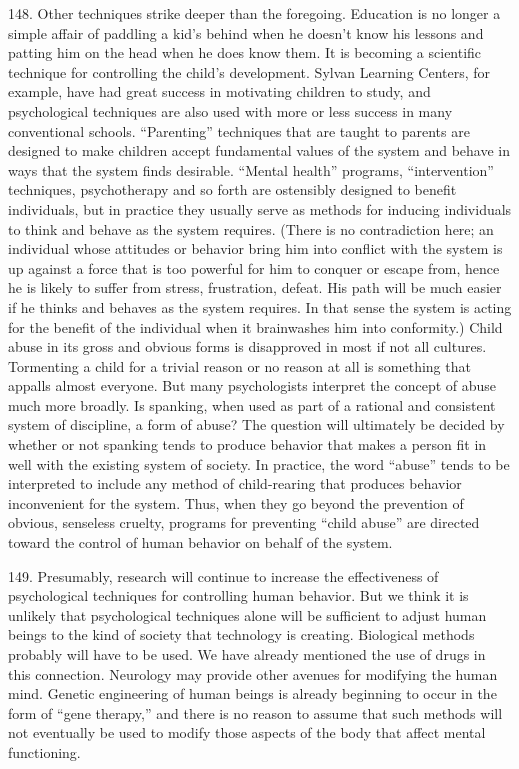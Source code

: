 \documentclass{article}
\begin{document}
148.  Other techniques strike deeper than the foregoing.  Education is no longer a simple affair of 
paddling a kid’s behind when he doesn’t know his lessons and patting him on the head when he 
does know them.  It is becoming a scientific technique for controlling the child’s 
development.   Sylvan  Learning  Centers,  for  example,  have  had  great  success  in  motivating  
children to study, and psychological techniques are also used with more or less success in many 
conventional  schools.  “Parenting”  techniques  that  are  taught  to  parents  are  designed  to  make  
children  accept  fundamental  values  of  the  system  and  behave  in  ways  that  the  system  finds  
desirable.  “Mental  health”  programs,  “intervention”  techniques,  psychotherapy  and  so  forth  are  
ostensibly  designed  to  benefit  individuals,  but  in  practice  they  usually  serve  as  methods  for  
inducing individuals to think and behave as the system requires.  (There is no contradiction here; 
an individual whose attitudes or behavior bring him into conflict with the system is up against a 
force  that  is  too  powerful  for  him  to  conquer  or  escape  from,  hence  he  is  likely  to  suffer  from  
stress,  frustration,  defeat.   His  path  will  be  much  easier  if  he  thinks  and  behaves  as  the  system  
requires.  In that sense the system is acting for the benefit of the individual when it brainwashes 
him into conformity.) Child abuse in its gross and obvious forms is disapproved in most if not all 
cultures.  Tormenting a child for a trivial reason or no reason at all is something that appalls almost 
everyone.  But many psychologists interpret the concept of abuse much more broadly.  Is spanking, 
when used as part of a rational and consistent system of discipline, a form of abuse? The question 
will  ultimately  be  decided  by  whether  or  not  spanking  tends  to  produce  behavior  that  makes  a  
person fit in well with the existing system of society.   In practice, the word “abuse” tends to be 
interpreted  to  include  any  method  of  child-rearing  that  produces  behavior  inconvenient  for  the  
system.   Thus,  when  they  go  beyond  the  prevention  of  obvious,  senseless  cruelty,  programs  for  
preventing  “child  abuse”  are  directed  toward  the  control  of  human  behavior  on  behalf  of  the  
system. \vspace{\baselineskip}
 
149.  Presumably, research will continue to increase the effectiveness of psychological techniques 
for controlling human behavior.  But we think it is unlikely that psychological techniques alone 
will be sufficient to adjust human beings to the kind of society that technology is 
creating.  Biological methods probably will have to be used.  We have already mentioned the use 
of  drugs  in  this  connection.   Neurology  may  provide  other  avenues  for  modifying  the  human  
mind.  Genetic engineering of human beings is already beginning to occur in the form of “gene 
therapy,” and there is no reason to assume that such methods will not eventually be used to modify 
those aspects of the body that affect mental functioning. \vspace{\baselineskip}
\end{document}
